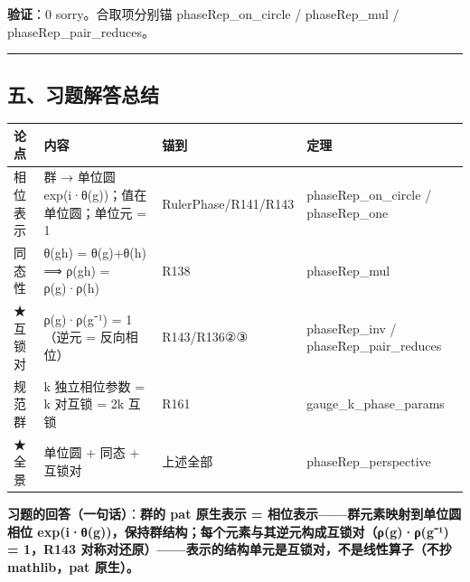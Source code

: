 \documentclass[
]{article}
\newcounter{none} %
\begin{document}
\textbf{验证}：0 sorry。合取项分别锚 phaseRep\_on\_circle /
phaseRep\_mul / phaseRep\_pair\_reduces。

\begin{center}\rule{0.5\linewidth}{0.5pt}\end{center}

\subsection{五、习题解答总结}\label{ux4e94ux4e60ux9898ux89e3ux7b54ux603bux7ed3}

{\def\LTcaptype{none} %
\begin{longtable}[]{@{}
  >{\raggedright\arraybackslash}p{}
  >{\raggedright\arraybackslash}p{}
  >{\raggedright\arraybackslash}p{}
  >{\raggedright\arraybackslash}p{}@{}}
\toprule\noalign{}
\begin{minipage}[b]{\linewidth}\raggedright
论点
\end{minipage} & \begin{minipage}[b]{\linewidth}\raggedright
内容
\end{minipage} & \begin{minipage}[b]{\linewidth}\raggedright
锚到
\end{minipage} & \begin{minipage}[b]{\linewidth}\raggedright
定理
\end{minipage} \\
\midrule\noalign{}
\endhead
\bottomrule\noalign{}
\endlastfoot
相位表示 & 群 → 单位圆 exp(i·θ(g))；值在单位圆；单位元 = 1 &
RulerPhase/R141/R143 & phaseRep\_on\_circle / phaseRep\_one \\
同态性 & θ(gh) = θ(g)+θ(h) ⟹ ρ(gh) = ρ(g)·ρ(h) & R138 & phaseRep\_mul \\
★互锁对 & ρ(g)·ρ(g⁻¹) = 1（逆元 = 反向相位） & R143/R136②③ &
phaseRep\_inv / phaseRep\_pair\_reduces \\
规范群 & k 独立相位参数 = k 对互锁 = 2k 互锁 & R161 &
gauge\_k\_phase\_params \\
★全景 & 单位圆 + 同态 + 互锁对 & 上述全部 & phaseRep\_perspective \\
\end{longtable}
}

\textbf{习题的回答（一句话）}：\textbf{群的 pat 原生表示 =
相位表示------群元素映射到单位圆相位
exp(i·θ(g))，保持群结构；每个元素与其逆元构成互锁对（ρ(g)·ρ(g⁻¹) =
1，R143 对称对还原）------表示的结构单元是互锁对，不是线性算子（不抄
mathlib，pat 原生）。}
\end{document}
